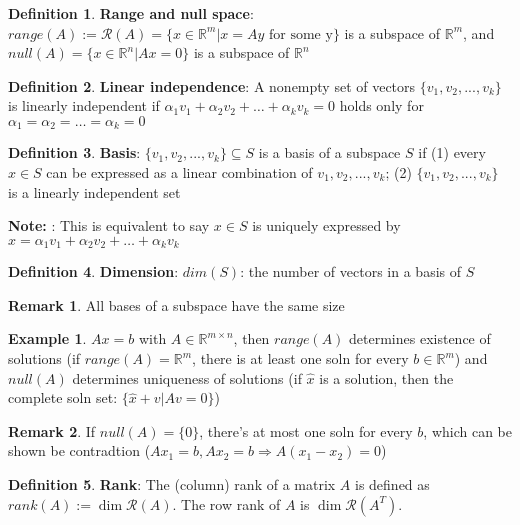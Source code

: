 \documentclass[10pt]{article}
\def\R{\mathbb{R}}
\def\a{\alpha}
\def\imp{\Rightarrow}
\theoremstyle{definition}
\newtheorem{defn}{Definition}[section]
\newtheorem{example}{Example}[section]
\newtheorem{remark}{Remark}[section]
\newcommand{\Note}[0]{\noindent\textbf{Note: }}
\begin{document}
\begin{defn} \textbf{Range and null space}:
	$range(A) := \mathcal{R}(A) = \{x\in \R^m | x = Ay \text{ for some y} \}$ is a subspace of $\R^m$, and
	$null(A) = \{x\in \R^n | Ax = 0\}$ is a subspace of $\R^n$
\end{defn}

\begin{defn} \textbf{Linear independence}:
	A nonempty set of vectors $\{v_1, v_2, ..., v_k\}$ is linearly independent if
	$\a_{1}v_{1} + \a_{2}v_{2} + \dots + \a_{k}v_{k} = 0$ holds only for
	$\a_{1} = \a_{2} = \dots = \a_{k} = 0$
\end{defn}

\begin{defn} \textbf{Basis}:
	$\{v_1, v_2, ..., v_k\} \subseteq S$ is a basis of a subspace $S$ if
	(1) every $x \in S$ can be expressed as a linear combination of $v_1, v_2, ..., v_k$;
	(2) $\{v_1, v_2, ..., v_k\}$ is a linearly independent set
\end{defn}
\Note: This is equivalent to say $x \in S$ is uniquely expressed by
$x = \a_{1}v_{1} + \a_{2}v_{2} + \dots + \a_{k}v_{k}$

\begin{defn} \textbf{Dimension}:
	$dim(S)$: the number of vectors in a basis of $S$
\end{defn}

\begin{remark}
	All bases of a subspace have the same size
\end{remark}

\begin{example}
	$Ax = b$ with $A \in \R^{m\times n}$, then $range(A)$ determines existence of solutions
	(if $range(A) = \R^m$, there is at least one soln for every $b \in \R^m$)
	and $null(A)$ determines uniqueness of solutions
	(if $\hat{x}$ is a solution, then the complete soln set: $\{\hat{x} + v | Av = 0\}$)
\end{example}

\begin{remark}
	If $null(A) = \{0\}$, there's at most one soln for every $b$, which can be shown be contradtion
	($Ax_1 = b, Ax_2 = b \imp A(x_{1}-x_{2}) = 0$)
\end{remark}

\begin{defn} \textbf{Rank}:
	The (column) rank of a matrix $A$ is defined as $rank(A) := \dim \mathcal{R}(A)$.
	The row rank of $A$ is $\dim \mathcal{R}(A^T)$.
\end{defn}
\end{document}
